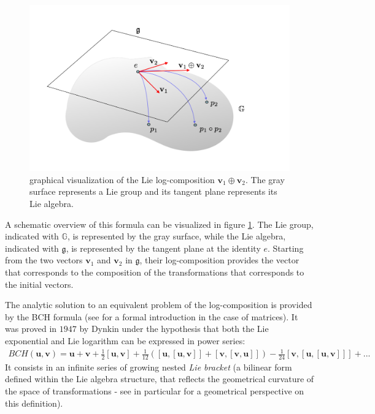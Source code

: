 \begin{figure}[!ht]
	\centering
	\includegraphics[scale=0.35]{figures/log_composition.pdf}
	\caption{graphical visualization of the Lie log-composition $\mathbf{v}_{1}\oplus \mathbf{v}_{2}$. The gray surface represents a Lie group and its tangent plane represents its Lie algebra. }
	\label{fig:composition}
\end{figure}

A schematic overview of this formula can be visualized in figure \ref{fig:composition}. The Lie group, indicated with $\mathbb{G}$, is represented by the gray surface, while the Lie algebra, indicated with $\mathfrak{g}$, is represented by the tangent plane at the identity $e$.
Starting from the two vectors $\mathbf{v}_1$ and $\mathbf{v}_2$ in $\mathfrak{g}$, their log-composition provides the vector that corresponds to the composition of the transformations that corresponds to the initial vectors. 

% 
The analytic solution to an equivalent problem of the log-composition is provided by the BCH formula (see \cite{hall2015lie} for a formal introduction in the case of matrices). It was proved in $1947$ by Dynkin \cite{dynkin1947calculation} under the hypothesis that both the Lie exponential and Lie logarithm can be expressed in power series:
\begin{align*}
BCH(\mathbf{u},\mathbf{v}) 
= 
\mathbf{u} + \mathbf{v} + \frac{1}{2}[\mathbf{u},\mathbf{v}] + \frac{1}{12}([\mathbf{u},[\mathbf{u},\mathbf{v}]]
+ [\mathbf{v},[\mathbf{v},\mathbf{u}]]) - \frac{1}{24}[\mathbf{v},[\mathbf{u},[\mathbf{u},\mathbf{v}]]] +... 
\end{align*}
It consists in an infinite series of growing nested \emph{Lie bracket} (a bilinear form defined within the Lie algebra structure, that reflects the geometrical curvature of the space of transformations - see in particular \cite{misner1973gravitation} for a geometrical perspective on this definition).

